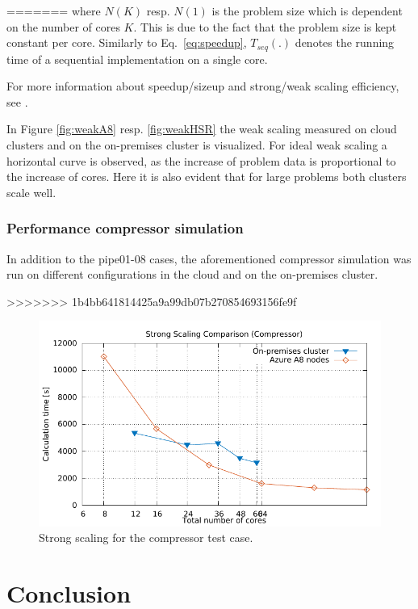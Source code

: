 \documentclass[3p,times]{elsarticle}
\begin{document}
=======
where $N(K)$ resp. $N(1)$ is the problem size which is dependent on the number of cores $K$. This is due to the fact that the problem size is kept constant per core.
 Similarly to Eq.~\ref{eq:speedup}, $T_{seq}(.)$ denotes the running time of a sequential implementation on a single core. 

For more information about speedup/sizeup and strong/weak scaling efficiency, see \cite{kaminsky15}.



In Figure \ref{fig:weakA8} resp. \ref{fig:weakHSR} the weak scaling measured on cloud clusters and on the on-premises cluster is visualized. For ideal weak scaling a horizontal curve is observed, as the increase of problem data is proportional to the increase of cores. Here it is also evident that for large problems both clusters scale well. 




\subsubsection{Performance compressor simulation}
In addition to the pipe01-08 cases, the aforementioned compressor simulation was run on different configurations in the cloud and on the on-premises cluster. 

>>>>>>> 1b4bb641814425a9a99db07b270854693156fe9f
\begin{figure}
	\centering
	\includegraphics[width=0.5\linewidth]{gplt-compressor}
	\caption{Strong scaling for the compressor test case. }
	\label{fig:stringCompressor}
\end{figure}

 
\section{Conclusion}
\label{sec:conclusions}
\end{document}
